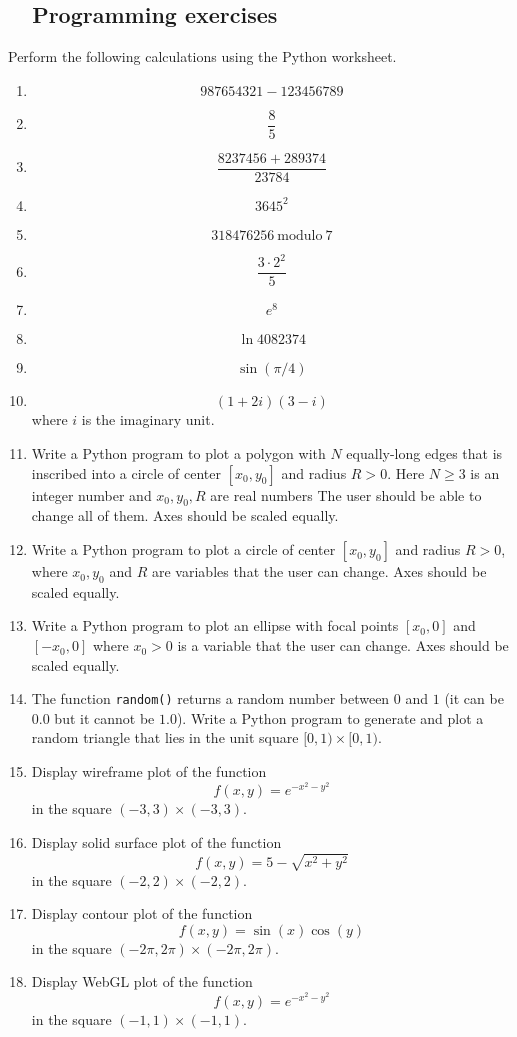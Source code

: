 \subsection{\ \ Programming exercises}
Perform the following calculations using the Python worksheet.
\begin{enumerate}
\item 
$$
  987654321 - 123456789
$$
\item 
$$
\frac{8}{5}
$$
\item 
$$
  \frac{8237456 + 289374}{23784}
$$ 
\item 
$$
  3645^2
$$
\item 
$$
  318476256 \ \mbox{modulo} \ 7
$$
\item 
$$
  \frac{3\cdot 2^2}{5} 
$$
\item 
$$
  e^8
$$
\item 
$$
  \ln 4082374
$$
\item 
$$
  \sin(\pi / 4)
$$
\item 
$$
  (1 + 2i)(3 - i)
$$
where $i$ is the imaginary unit.
\item Write a Python program to plot a polygon with $N$ equally-long edges that is inscribed into a circle of 
center $[x_0, y_0]$ and radius $R > 0$. Here $N \ge 3$ is an integer number and $x_0, y_0, R$ are real numbers
The user should be able to change all of them. Axes should be scaled equally.
\item Write a Python program to plot a circle of center $[x_0, y_0]$ and radius $R > 0$, where 
$x_0, y_0$ and $R$ are variables that the user can change. Axes should be scaled equally.
\item Write a Python program to plot an ellipse with focal points $[x_0, 0]$ and $[-x_0, 0]$ where 
$x_0 > 0$ is a variable that the user can change. Axes should be scaled equally.
\item The function {\tt random()} returns a random number between $0$ and $1$ (it can be $0.0$ but it cannot be $1.0$).
Write a Python program to generate and plot a random triangle that lies in the unit square $[0, 1) \times [0, 1)$. 
\item Display wireframe plot of the function 
$$
f(x, y) = e^{-x^2 - y^2}
$$
in the square $(-3, 3)\times (-3, 3)$.
\item Display solid surface plot of the function 
$$
f(x, y) = 5 - \sqrt{x^2 + y^2}
$$
in the square $(-2, 2)\times (-2, 2)$.
\item Display contour plot of the function 
$$
f(x, y) = \sin(x) \cos(y) 
$$
in the square $(-2\pi, 2\pi)\times (-2\pi, 2\pi)$.
\item Display WebGL plot of the function
$$
f(x, y) = e^{-x^2 - y^2}
$$
in the square $(-1, 1)\times (-1, 1)$.

\end{enumerate}

